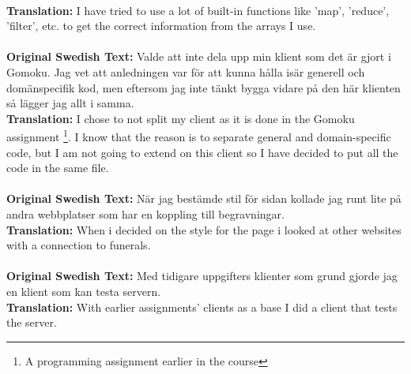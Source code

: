 \documentclass[twoside,twocolumn,a4paper,11pt,english]{article}
\begin{document}
\\
\textbf{Translation:} I have tried to use a lot of built-in functions like 'map', 'reduce', 'filter', etc. to get the correct information from the arrays I use.
\\
\\
\textbf{Original Swedish Text:} Valde att inte dela upp min klient som det är gjort i Gomoku. Jag vet att anledningen var för att kunna hålla isär generell och domänspecifik kod, men eftersom jag inte tänkt bygga vidare på den här klienten så lägger jag allt i samma.
\\
\textbf{Translation:} I chose to not split my client as it is done in the Gomoku assignment \footnote{A programming assignment earlier in the course}. I know that the reason is to separate general and domain-specific code, but I am not going to extend on this client so I have decided to put all the code in the same file.
\\
\\
\textbf{Original Swedish Text:} När jag bestämde stil för sidan kollade jag runt lite på andra webbplatser som har en koppling till begravningar.
\\
\textbf{Translation:} When i decided on the style for the page i looked at other websites with a connection to funerals.
\\
\\
\textbf{Original Swedish Text:} Med tidigare uppgifters klienter som grund gjorde jag en klient som kan testa servern.
\\
\textbf{Translation:} With earlier assignments' clients as a base I did a client that tests the server.
\end{document}
